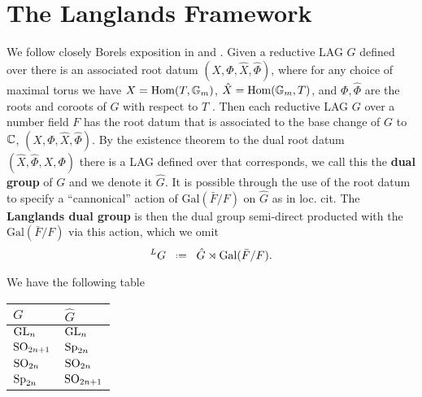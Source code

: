 \section{The Langlands Framework}
We follow closely Borels exposition in \cite[Part 2, ``Automorphic L-functions'']{borelAutomorphicFormsRepresentations1979} and \cite{shahidiEisensteinSeriesAutomorphic2010}.
Given a reductive LAG \(G\) defined over \C there is an associated root datum \((X, \Phi, \hat{X}, \hat{\Phi})\), where for any choice of maximal torus we have \(X = \operatorname{Hom}(T, \mathbb{G}_m)\), \(\hat{X} = \operatorname{Hom}(\mathbb{G}_m, T)\), and \(\Phi, \hat\Phi\) are the roots and coroots of \(G\) with respect to \(T\) \cite[7.4.3]{springerLinearAlgebraicGroups1998}.  Then each reductive LAG \(G\) over a number field \(F\) has the root datum that is associated to the base change of \(G\) to \(\C\), \((X, \Phi, \hat{X}, \hat{\Phi})\).
By the existence theorem \cite[10]{springerLinearAlgebraicGroups1998} to the dual root datum \(( \hat{X}, \hat{\Phi}, X, \Phi)\) there is a LAG defined over \C that corresponds, we call this the \textbf{dual group} of \(G\) and we denote it \(\hat{G}\). It is possible through the use of the root datum to specify a ``cannonical'' action of \(\mathrm{Gal}(\bar{F}/F)\) on \(\hat{G}\) as in loc. cit.
The \textbf{Langlands dual group} is then the dual group semi-direct producted with the \(\mathrm{Gal}(\bar{F}/F)\) via this action, which we omit
\[^L G \defeq \hat{G} \rtimes \mathrm{Gal}(\bar{F}/F).\]

\begin{example}
	We have the following table
	\begin{table}[h]
		\centering
		\begin{tabular}{ll}
			\(G\)         & \(\hat{G}\)   \\ \hline
			\(\operatorname{GL}_n\)     & \(\operatorname{GL}_n\)     \\
			\(\operatorname{SO}_{2n+1}\) & \(\operatorname{Sp}_{2n}\)  \\
			\(\operatorname{SO}_{2n}\)   & \(\operatorname{SO}_{2n}\)   \\
			\(\operatorname{Sp}_{2n}\)  & \(\operatorname{SO}_{2n+1}\)
		\end{tabular}
	\end{table}
\end{example}

